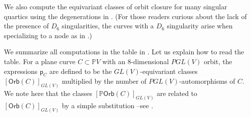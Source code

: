 \documentclass[12 pt, reqno]{amsart}
\theoremstyle{definition}
\newtheorem{rmk}[thm]{Remark}
\newcommand{\mb}{\mathbb}
\newcommand{\Orb}{\mathsf{Orb}}
\newcommand{\p}{\mathsf{p}}
\begin{document}
We also compute the equivariant classes of orbit closure for many
singular quartics using the degenerations in
. (For those readers curious about the lack of
the presence of $D_6$ singularities, the curves with a $D_6$
singularity arise when specializing to a node as in
.)




We summarize all computations in the table in .
Let us explain how to read the table.
For a plane curve $C\subset\mb{P} V$ with an $8$-dimensional $PGL(V)$
orbit, the expressions $\p_{C}$ are defined to be the
$GL(V)$-equivariant classes $[\Orb(C)]_{GL(V)}$ multiplied by the
number of $PGL(V)$-automorphisms of $C$. We note here that the classes
$[\mb{P}\Orb(C)]_{GL(V)}$ are related to $[\Orb(C)]_{GL(V)}$ by a
simple substitution --see .

\end{document}

